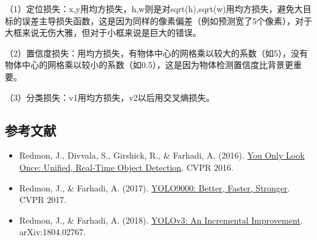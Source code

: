（1）定位损失：x,y用均方损失，h,w则是对sqrt(h),sqrt(w)用均方损失，避免大目标的误差主导损失函数，这是因为同样的像素偏差（例如预测宽了5个像素），对于大框来说无伤大雅，但对于小框来说是巨大的错误。

（2）置信度损失：用均方损失，有物体中心的网格乘以较大的系数（如5），没有物体中心的网格乘以较小的系数（如0.5），这是因为物体检测置信度比背景更重要。

（3）分类损失：v1用均方损失，v2以后用交叉熵损失。

\hypertarget{ux53c2ux8003ux6587ux732e-14}{%
\subsection{参考文献}\label{ux53c2ux8003ux6587ux732e-14}}

\begin{itemize}
\tightlist
\item
  Redmon, J., Divvala, S., Girshick, R., \& Farhadi, A. (2016). \href{https://arxiv.org/abs/1506.02640}{You Only Look Once: Unified, Real-Time Object Detection}. CVPR 2016.
\item
  Redmon, J., \& Farhadi, A. (2017). \href{https://arxiv.org/abs/1612.08242}{YOLO9000: Better, Faster, Stronger}. CVPR 2017.
\item
  Redmon, J., \& Farhadi, A. (2018). \href{https://arxiv.org/abs/1804.02767}{YOLOv3: An Incremental Improvement}. arXiv:1804.02767.
\end{itemize}

\clearpage
